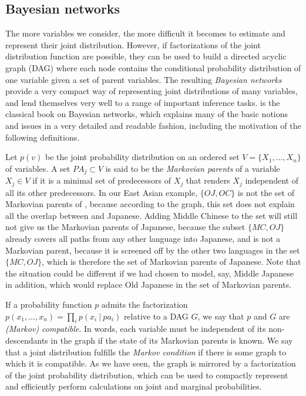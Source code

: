 \subsection{Bayesian networks}
The more variables we consider, the more difficult it becomes to estimate and represent their joint distribution. However, if factorizations of the joint distribution function are possible, they can be used to build a directed acyclic graph (DAG) where each node contains the conditional probability distribution of one variable given a set of parent variables. The resulting \textit{Bayesian networks} provide a very compact way of representing joint distributions of many variables, and lend themselves very well to a range of important inference tasks. \cite{pearl1988} is the classical book on Bayesian networks, which explains many of the basic notions and issues in a very detailed and readable fashion, including the motivation of the following definitions.

Let $p(v)$ be the joint probability distribution on an ordered set $V = \{X_1,\dots,X_n\}$ of variables. A set $PA_j \subset V$ is said to be the \textit{Markovian parents} of a variable $X_j \in V$ if it is a minimal set of predecessors of $X_j$ that renders $X_j$ independent of all its other predecessors. In our East Asian example, $\{OJ,OC\}$ is not the set of Markovian parents of , because according to the graph, this set does not explain all the overlap between  and Japanese. Adding Middle Chinese to the set will still not give us the Markovian parents of Japanese, because the subset $\{MC,OJ\}$ already covers all paths from any other language into Japanese, and  is not a Markovian parent, because it is screened off by the other two languages in the set $\{MC,OJ\}$, which is therefore the set of Markovian parents of Japanese. Note that the situation could be different if we had chosen to model, say, Middle Japanese in addition, which would replace Old 
Japanese in the set of Markovian parents.

If a probability function $p$ admits the factorization $p(x_1,\dots,x_n) = \prod_i p(x_i\ |\ pa_i)$ relative to a DAG $G$, we say that $p$ and $G$ are \textit{(Markov) compatible}. In words, each variable must be independent of its non-descendants in the graph if the state of its Markovian parents is known. We say that a joint distribution fulfills the \textit{Markov condition} if there is some graph to which it is compatible. As we have seen, the graph is mirrored by a factorization of the joint probability distribution, which can be used to compactly represent and efficiently perform calculations on joint and marginal probabilities.

